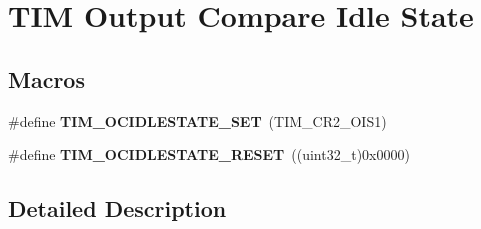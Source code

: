 \hypertarget{group___t_i_m___output___compare___idle___state}{\section{T\-I\-M Output Compare Idle State}
\label{group___t_i_m___output___compare___idle___state}
}
\subsection*{Macros}
\begin{DoxyCompactItemize}
\item 
\hypertarget{group___t_i_m___output___compare___idle___state_gad251b83b0e33ddd0ed2fb35aa747ef78}{\#define {\bfseries T\-I\-M\-\_\-\-O\-C\-I\-D\-L\-E\-S\-T\-A\-T\-E\-\_\-\-S\-E\-T}~(T\-I\-M\-\_\-\-C\-R2\-\_\-\-O\-I\-S1)}\label{group___t_i_m___output___compare___idle___state_gad251b83b0e33ddd0ed2fb35aa747ef78}

\item 
\hypertarget{group___t_i_m___output___compare___idle___state_ga56505fe4142096454f1da97683ce8bc2}{\#define {\bfseries T\-I\-M\-\_\-\-O\-C\-I\-D\-L\-E\-S\-T\-A\-T\-E\-\_\-\-R\-E\-S\-E\-T}~((uint32\-\_\-t)0x0000)}\label{group___t_i_m___output___compare___idle___state_ga56505fe4142096454f1da97683ce8bc2}

\end{DoxyCompactItemize}


\subsection{Detailed Description}
